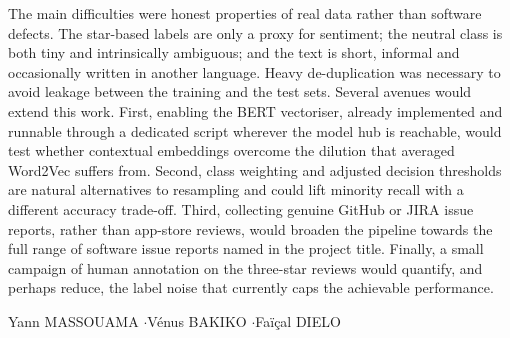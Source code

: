 \documentclass[11pt,a4paper]{article}
\begin{document}
The main difficulties were honest properties of real data rather than software defects.
The star-based labels are only a proxy for sentiment; the neutral class is both tiny and
intrinsically ambiguous; and the text is short, informal and occasionally written in
another language. Heavy de-duplication was necessary to avoid leakage between the
training and the test sets. Several avenues would extend this work. First, enabling the
BERT vectoriser, already implemented and runnable through a dedicated script wherever the
model hub is reachable, would test whether contextual embeddings overcome the dilution
that averaged Word2Vec suffers from. Second, class weighting and adjusted decision
thresholds are natural alternatives to resampling and could lift minority recall with a
different accuracy trade-off. Third, collecting genuine GitHub or JIRA issue reports,
rather than app-store reviews, would broaden the pipeline towards the full range of
software issue reports named in the project title. Finally, a small campaign of human
annotation on the three-star reviews would quantify, and perhaps reduce, the label noise
that currently caps the achievable performance.

\vfill
\begin{center}
\small\textcolor{primary}{Yann MASSOUAMA \quad$\cdot$\quad Vénus BAKIKO \quad$\cdot$\quad Faïçal DIELO}
\end{center}
\end{document}
